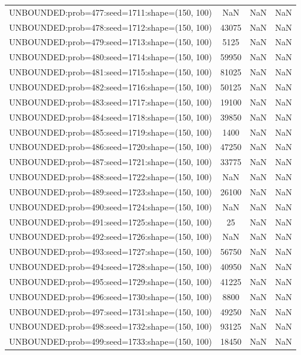 \begin{longtable}{lccc}
UNBOUNDED:prob=477:seed=1711:shape=(150, 100) &   NaN &   NaN &    NaN \\
UNBOUNDED:prob=478:seed=1712:shape=(150, 100) & 43075 &   NaN &    NaN \\
UNBOUNDED:prob=479:seed=1713:shape=(150, 100) &  5125 &   NaN &    NaN \\
UNBOUNDED:prob=480:seed=1714:shape=(150, 100) & 59950 &   NaN &    NaN \\
UNBOUNDED:prob=481:seed=1715:shape=(150, 100) & 81025 &   NaN &    NaN \\
UNBOUNDED:prob=482:seed=1716:shape=(150, 100) & 50125 &   NaN &    NaN \\
UNBOUNDED:prob=483:seed=1717:shape=(150, 100) & 19100 &   NaN &    NaN \\
UNBOUNDED:prob=484:seed=1718:shape=(150, 100) & 39850 &   NaN &    NaN \\
UNBOUNDED:prob=485:seed=1719:shape=(150, 100) &  1400 &   NaN &    NaN \\
UNBOUNDED:prob=486:seed=1720:shape=(150, 100) & 47250 &   NaN &    NaN \\
UNBOUNDED:prob=487:seed=1721:shape=(150, 100) & 33775 &   NaN &    NaN \\
UNBOUNDED:prob=488:seed=1722:shape=(150, 100) &   NaN &   NaN &    NaN \\
UNBOUNDED:prob=489:seed=1723:shape=(150, 100) & 26100 &   NaN &    NaN \\
UNBOUNDED:prob=490:seed=1724:shape=(150, 100) &   NaN &   NaN &    NaN \\
UNBOUNDED:prob=491:seed=1725:shape=(150, 100) &    25 &   NaN &    NaN \\
UNBOUNDED:prob=492:seed=1726:shape=(150, 100) &   NaN &   NaN &    NaN \\
UNBOUNDED:prob=493:seed=1727:shape=(150, 100) & 56750 &   NaN &    NaN \\
UNBOUNDED:prob=494:seed=1728:shape=(150, 100) & 40950 &   NaN &    NaN \\
UNBOUNDED:prob=495:seed=1729:shape=(150, 100) & 41225 &   NaN &    NaN \\
UNBOUNDED:prob=496:seed=1730:shape=(150, 100) &  8800 &   NaN &    NaN \\
UNBOUNDED:prob=497:seed=1731:shape=(150, 100) & 49250 &   NaN &    NaN \\
UNBOUNDED:prob=498:seed=1732:shape=(150, 100) & 93125 &   NaN &    NaN \\
UNBOUNDED:prob=499:seed=1733:shape=(150, 100) & 18450 &   NaN &    NaN \\

\end{longtable}
